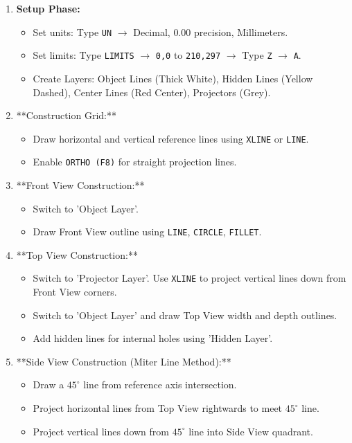 \begin{enumerate}
    \item \textbf{Setup Phase:}
    \begin{itemize}
        \item Set units: Type \texttt{UN} $\to$ Decimal, $0.00$ precision, Millimeters.
        \item Set limits: Type \texttt{LIMITS} $\to$ \texttt{0,0} to \texttt{210,297} $\to$ Type \texttt{Z} $\to$ \texttt{A}.
        \item Create Layers: Object Lines (Thick White), Hidden Lines (Yellow Dashed), Center Lines (Red Center), Projectors (Grey).
    \end{itemize}
    \item **Construction Grid:**
    \begin{itemize}
        \item Draw horizontal and vertical reference lines using \texttt{XLINE} or \texttt{LINE}.
        \item Enable \texttt{ORTHO (F8)} for straight projection lines.
    \end{itemize}
    \item **Front View Construction:**
    \begin{itemize}
        \item Switch to 'Object Layer'.
        \item Draw Front View outline using \texttt{LINE}, \texttt{CIRCLE}, \texttt{FILLET}.
    \end{itemize}
    \item **Top View Construction:**
    \begin{itemize}
        \item Switch to 'Projector Layer'. Use \texttt{XLINE} to project vertical lines down from Front View corners.
        \item Switch to 'Object Layer' and draw Top View width and depth outlines.
        \item Add hidden lines for internal holes using 'Hidden Layer'.
    \end{itemize}
    \item **Side View Construction (Miter Line Method):**
    \begin{itemize}
        \item Draw a $45^\circ$ line from reference axis intersection.
        \item Project horizontal lines from Top View rightwards to meet $45^\circ$ line.
        \item Project vertical lines down from $45^\circ$ line into Side View quadrant.

\end{itemize}
\end{enumerate}
